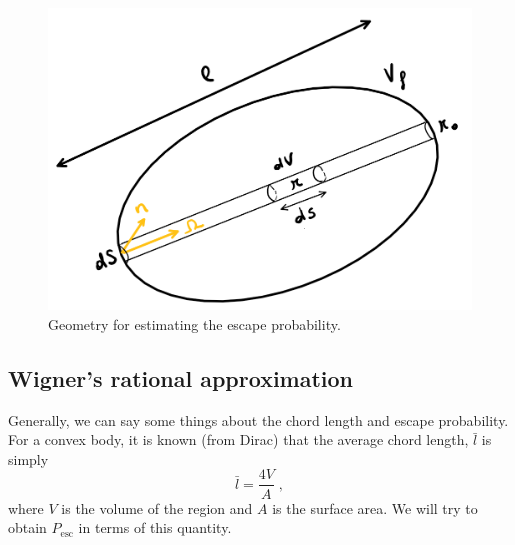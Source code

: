 \begin{figure}[h]
  \centering
  \includegraphics[scale=0.60]{./Figures/P6/escapeProb.png} 
  \caption{Geometry for estimating the escape probability.} 
  \label{fig:escape}
\end{figure}

\subsection{Wigner's rational approximation}

Generally, we can say some things about the chord length and escape probability. For a convex body, it is known (from Dirac) that the average chord length, $\bar{l}$ is simply
\begin{equation*}
    \bar{l} = \frac{4V}{A}\;\mathrm{,}
\end{equation*}
where $V$ is the volume of the region and $A$ is the surface area. We will try to obtain $P_\mathrm{esc}$ in terms of this quantity. 

